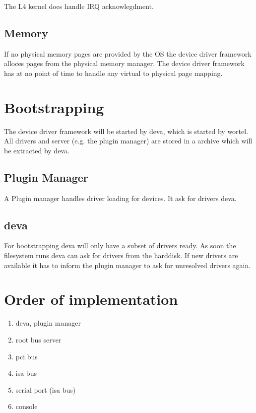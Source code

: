The L4 kernel does handle IRQ acknowlegdment. 

\subsection{Memory}

If no physical memory pages are provided by the OS the device driver
framework alloces pages from the physical memory manager.  The device
driver framework has at no point of time to handle any virtual to
physical page mapping.


\section{Bootstrapping}

The device driver framework will be started by deva, which is started
by wortel.  All drivers and server (e.g. the plugin manager) are
stored in a archive which will be extracted by deva.

\subsection{Plugin Manager}

A Plugin manager handles driver loading for devices.  It ask for drivers
deva.  

\subsection{deva}

For bootstrapping deva will only have a subset of drivers ready.  
As soon the filesystem runs deva can ask for drivers from the harddisk. 
If new drivers are available it has to inform the plugin manager to ask
for unresolved drivers again.


\section{Order of implementation}

\begin{enumerate}
\item deva, plugin manager
\item root bus server
\item pci bus
\item isa bus
\item serial port  (isa bus)
\item console 
\end{enumerate}

